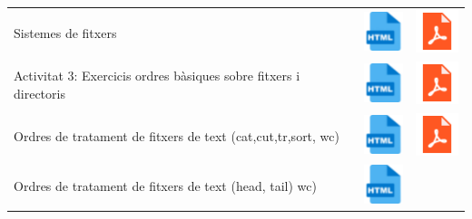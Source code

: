 \documentclass[
  12 pt,
  a4paper,
]{article}
\begin{document}
\begin{longtable}[]{@{}
  >{\raggedright\arraybackslash}p{}
  >{\raggedright\arraybackslash}p{}
  >{\raggedright\arraybackslash}p{}@{}}
\toprule\noalign{}
\endhead
\bottomrule\noalign{}
\endlastfoot
Sistemes de fitxers &
\href{U4-SISTEMA_DE_FITXERS/UNITAT-4.-Sistema-de-fitxers-Ubuntu.html}{\includegraphics{recursos/iconohtml.png}}
&
\href{U4-SISTEMA_DE_FITXERS/UNITAT-4.-Sistema-de-fitxers-Ubuntu.pdf}{\includegraphics{recursos/iconopdf.png}} \\
Activitat 3: Exercicis ordres bàsiques sobre fitxers i directoris &
\href{U4-SISTEMA_DE_FITXERS/U4-Activitat4.html}{\includegraphics{recursos/iconohtml.png}}
&
\href{U4-SISTEMA_DE_FITXERS/U4-Activitat4.pdf}{\includegraphics{recursos/iconopdf.png}} \\
Ordres de tratament de fitxers de text (cat,cut,tr,sort, wc) &
\href{U4-SISTEMA_DE_FITXERS_TRACTAMENT_TEXT/U4-Sistema_de_fitxers_tractament_text.html}{\includegraphics{recursos/iconohtml.png}}
&
\href{U4-SISTEMA_DE_FITXERS_TRACTAMENT_TEXT/U4-Sistema_de_fitxers_tractament_text.pdf}{\includegraphics{recursos/iconopdf.png}} \\
Ordres de tratament de fitxers de text (head, tail) wc) &
\href{U4-SISTEMA_DE_FITXERS_TRACTAMENT_TEXT_2/U4-Sistema_de_fitxers_tractament_text-2.html}{\includegraphics{recursos/iconohtml.png}}

\end{longtable}
\end{document}
